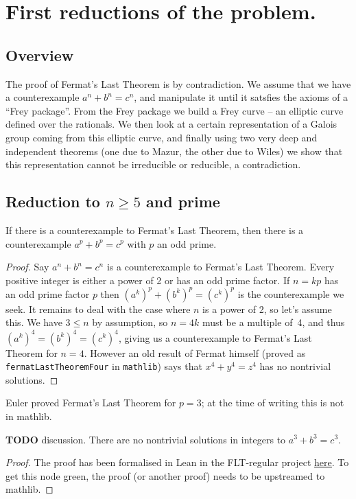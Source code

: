 \chapter{First reductions of the problem.}

\section{Overview}
The proof of Fermat's Last Theorem is by contradiction. We assume that we have a counterexample $a^n+b^n=c^n$, and manipulate it until it satsfies the axioms of a ``Frey package''. From the Frey package we build a Frey curve -- an elliptic curve defined over the rationals. We then look at a certain representation of a Galois group coming from this elliptic curve, and finally using two very deep and independent theorems (one due to Mazur, the other due to Wiles) we show that this representation cannot be irreducible or reducible, a contradiction.

\section{Reduction to \texorpdfstring{$n\geq5$}{ngeq5} and prime}

\begin{lemma}\label{WLOG_n_prime}\leanok
  If there is a counterexample to Fermat's Last Theorem, then there is a counterexample $a^p+b^p=c^p$
  with $p$ an odd prime.
\end{lemma}
\begin{proof}\leanok
  Say $a^n + b^n = c^n$ is a counterexample to Fermat's Last Theorem. Every positive integer is either
  a power of 2 or has an odd prime factor. If $n=kp$ has an odd prime factor $p$ then
  $(a^k)^p+(b^k)^p=(c^k)^p$ is the counterexample we seek. It remains to deal with the case where
  $n$ is a power of 2, so let's assume this. We have $3\leq n$ by assumption, so
  $n=4k$ must be a multiple of~4, and thus $(a^k)^4=(b^k)^4=(c^k)^4$, giving us a counterexample
  to Fermat's Last Theorem for $n=4$. However an old result of Fermat himself (proved as {\tt fermatLastTheoremFour} in {\tt mathlib}) says that $x^4+y^4=z^4$ has no nontrivial solutions.
\end{proof}

Euler proved Fermat's Last Theorem for $p=3$; at the time of writing this is not in mathlib.

\begin{lemma}\label{p_not_three}\leanok
{\bf TODO} discussion.
  There are no nontrivial solutions in integers to $a^3+b^3=c^3$.
\end{lemma}
\begin{proof}
  The proof has been formalised in Lean in the FLT-regular project \href{https://github.com/leanprover-community/flt-regular/blob/861b7df057140b45b8bb7d30d33426ffbbdda52b/FltRegular/FltThree/FltThree.lean#L698}{\underline{here}}. To get this node green, the proof (or another proof) needs to be upstreamed to mathlib.
\end{proof}

